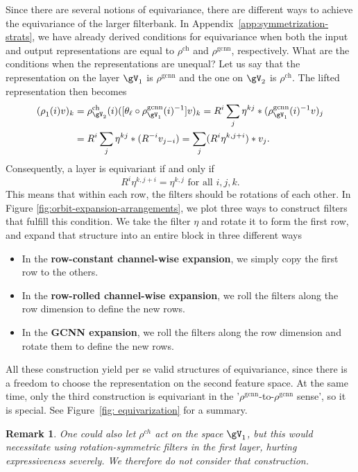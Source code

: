 \documentclass{article}
\newtheorem{remark}{Remark}
\begin{document}
Since there are several notions of equivariance, there are different ways to achieve the equivariance of the larger filterbank. In Appendix~\ref{app:symmetrization-strats}, we have already derived conditions for equivariance when both the input and output representations are equal to $\rho^{\mathrm{ch}}$ and $\rho^{\mathrm{gcnn}}$, respectively. What are the conditions when the representations are unequal? Let us say that the representation on the layer $\gV_1$ is $\rho^{\mathrm{gcnn}}$ and the one on $\gV_2$ is $\rho^{\mathrm{ch}}$. The lifted representation then becomes
  \begin{align*}
           (\rho^{}_{1}(i)v)_k &= \rho_{\gV_{2}}^{\mathrm{ch}}(i) ([\theta_\ell \circ \rho_{\gV_1}^{\mathrm{gcnn}}(i)^{-1}]v)_k = R^i\sum_{j}\eta^{kj}*(\rho_{\gV_1}^{\mathrm{gcnn}}(i)^{-1}v)_j \\
    &= R^i\sum_{j}\eta^{kj}*(R^{-i}v_{j-i}) = \sum_{j}(R^i\eta^{k,j+i})*v_j. 
    \end{align*}
    Consequently, a layer is equivariant if and only if 
    \begin{equation}
        R^i\eta^{k,j+i}=\eta^{k,j} \text{ for all }i,j,k.
    \end{equation} 
    This means that within each row,  the filters should be rotations of each other. In Figure \ref{fig:orbit-expansion-arrangements}, we plot three ways to construct filters that fulfill this condition. We take the filter $\eta$ and rotate it to form the first row, and expand that structure into an entire block in three different ways
    \begin{itemize}
        \item In the \textbf{row-constant channel-wise expansion}, we simply copy the first row to the others.
        \item In the \textbf{row-rolled channel-wise expansion}, we roll the filters along the row dimension to define the new rows. 
        \item In the \textbf{GCNN expansion}, we roll the filters along the row dimension and rotate them to define the new rows. 
    \end{itemize}  
    All these construction yield per se valid structures of equivariance, since there is a freedom to choose the representation on the second feature space.  At the same time, only the third construction is equivariant in the '$\rho^{\mathrm{gcnn}}$-to-$\rho^{\mathrm{gcnn}}$ sense', so it is special. See Figure~\ref{fig: equivarization} for a summary.

    \begin{remark}
        One could also let $\rho^{ch}$ act on the space $\gV_1$, but this would necessitate using rotation-symmetric filters in the first layer, hurting expressiveness severely. We therefore do not consider that construction.
    \end{remark}
\end{document}
